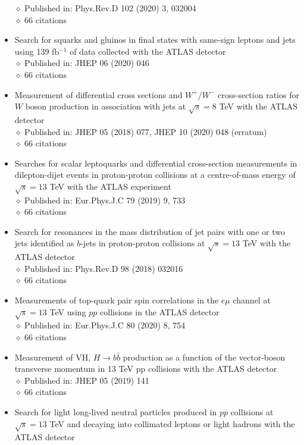 \documentclass[margin, 10pt]{res} %
\begin{document}
\begin{resume}
\begin{itemize}
$\diamond$ Published in: Phys.Rev.D 102 (2020) 3, 032004\\
$\diamond$ 66 citations
\item Search for squarks and gluinos in final states with same-sign leptons and jets using 139 fb$^{-1}$ of data collected with the ATLAS detector\\
$\diamond$ Published in: JHEP 06 (2020) 046\\
$\diamond$ 66 citations
\item Measurement of differential cross sections and $W^{+}/W^{-}$ cross-section ratios for $W$ boson production in association with jets at $\sqrt{s} = 8$ TeV with the ATLAS detector\\
$\diamond$ Published in: JHEP 05 (2018) 077, JHEP 10 (2020) 048 (erratum)\\
$\diamond$ 66 citations
\item Searches for scalar leptoquarks and differential cross-section measurements in dilepton-dijet events in proton-proton collisions at a centre-of-mass energy of $\sqrt{s} = 13$ TeV with the ATLAS experiment\\
$\diamond$ Published in: Eur.Phys.J.C 79 (2019) 9, 733\\
$\diamond$ 66 citations
\item Search for resonances in the mass distribution of jet pairs with one or two jets identified as $b$-jets in proton-proton collisions at $\sqrt{s} = 13$ TeV with the ATLAS detector\\
$\diamond$ Published in: Phys.Rev.D 98 (2018) 032016\\
$\diamond$ 66 citations
\item Measurements of top-quark pair spin correlations in the $e\mu$ channel at $\sqrt{s} = 13$ TeV using $pp$ collisions in the ATLAS detector\\
$\diamond$ Published in: Eur.Phys.J.C 80 (2020) 8, 754\\
$\diamond$ 66 citations
\item Measurement of VH, $H \rightarrow b\bar{b}$ production as a function of the vector-boson transverse momentum in 13 TeV pp collisions with the ATLAS detector\\
$\diamond$ Published in: JHEP 05 (2019) 141 \\
$\diamond$ 66 citations
\item Search for light long-lived neutral particles produced in $pp$ collisions at $\sqrt{s} = 13$ TeV and decaying into collimated leptons or light hadrons with the ATLAS detector\\

\end{itemize}
\end{resume}
\end{document}

